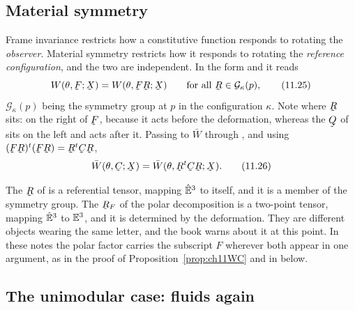 \subsection{Material symmetry}\label{sec:ch11symm}

Frame invariance restricts how a constitutive function responds to
rotating the \emph{observer}. Material symmetry restricts how it
responds to rotating the \emph{reference configuration}, and the two are
independent. In the form  and  it reads
\begin{equation}
   W(\theta,\bF;\bX)=W(\theta,\bF\bR;\bX)
   \qquad\text{for all }\bR\in\mathcal{G}_{\kappa}(p),
   \tag{11.25}\label{eq:11.25}
\end{equation}
$\mathcal{G}_{\kappa}(p)$ being the symmetry group at $p$ in the
configuration $\kappa$. Note where $\bR$ sits: on the right of $\bF$,
because it acts before the deformation, whereas the $\bQ$ of 
sits on the left and acts after it. Passing to $\bar W$ through
, and using $(\bF\bR)^{t}(\bF\bR)=\bR^{t}\bC\bR$,
\begin{equation}
   \bar W(\theta,\bC;\bX)=\bar W(\theta,\bR^{t}\bC\bR;\bX).
   \tag{11.26}\label{eq:11.26}
\end{equation}

\begin{remark}%
\label{rem:ch11tworot}
The $\bR$ of  is a referential tensor, mapping $\hat{\mathbb{E}}^{3}$ to
itself, and it is a member of the symmetry group. The $\bR_{F}$ of the
polar decomposition is a two-point tensor, mapping $\hat{\mathbb{E}}^{3}$ to $\mathbb{E}^{3}$, and
it is determined by the deformation. They are different objects wearing
the same letter, and the book warns about it at this point. In these
notes the polar factor carries the subscript $F$ wherever both appear in
one argument, as in the proof of Proposition~\ref{prop:ch11WC} and in
 below.
\end{remark}

\subsection*{The unimodular case: fluids again}

